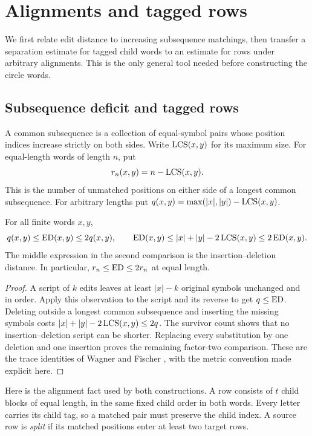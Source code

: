 \section{Alignments and tagged rows}\label{sec:preliminaries}

We first relate edit distance to increasing subsequence matchings, then
transfer a separation estimate for tagged child words to an estimate for
rows under arbitrary alignments. This is the only general tool needed
before constructing the circle words.

\subsection{Subsequence deficit and tagged rows}
A common subsequence is a collection of equal-symbol pairs whose position
indices increase strictly on both sides. Write $\operatorname{LCS}(x,y)$ for its maximum
size. For equal-length words of length $n$, put
\[
 r_n(x,y)=n-\operatorname{LCS}(x,y).
\]
This is the number of unmatched positions on either side of a longest
common subsequence. For arbitrary lengths put
$q(x,y)=\max(|x|,|y|)-\operatorname{LCS}(x,y)$.

\begin{lemma}\label{pre:metric}
For all finite words $x,y$,
\[
 q(x,y)\leq\operatorname{ED}(x,y)\leq2q(x,y),\qquad
 \operatorname{ED}(x,y)\leq |x|+|y|-2\operatorname{LCS}(x,y)\leq2\operatorname{ED}(x,y).
\]
The middle expression in the second comparison is the insertion--deletion
distance. In particular, $r_n\leq\operatorname{ED}\leq2r_n$ at equal length.
\end{lemma}
\begin{proof}
A script of $k$ edits leaves at least $|x|-k$ original symbols unchanged
and in order. Apply this observation to the script and its reverse to get
$q\leq\operatorname{ED}$. Deleting outside a longest common subsequence and inserting
the missing symbols costs $|x|+|y|-2\operatorname{LCS}(x,y)\leq2q$.
The survivor count shows that no insertion--deletion script can be shorter.
Replacing every substitution by one deletion and one insertion proves the
remaining factor-two comparison. These are the trace identities of
Wagner and Fischer \cite{WagnerFischer1974}, with the metric convention
made explicit here.
\end{proof}

Here is the alignment fact used by both constructions. A row consists of
$t$ child blocks of equal length, in the same fixed child order in both
words. Every letter carries its child tag, so a matched pair must preserve
the child index. A source row is \emph{split} if its matched positions enter
at least two target rows.

